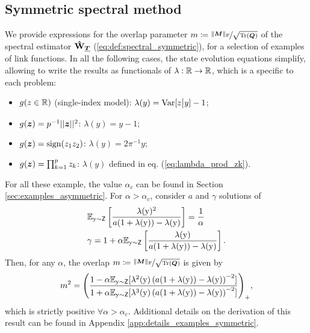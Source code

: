 \subsection{Symmetric spectral method}
We provide expressions for the overlap parameter $m \coloneqq \nicefrac{ \|{\boldsymbol M} \|_{\mathrm{F}} }{\sqrt{{\rm Tr}({\boldsymbol Q})}}$ of the spectral estimator $\boldsymbol{\mathbf{\hat{W}}}_{{\underline{\bm{T}}}}$ (\ref{eq:def:spectral_symmetric}), for a selection of examples of link functions.
In all the following cases, the state evolution equations simplify, allowing to write the results as functionals of $\lambda:\mathbb{R}\to\mathbb{R}$, which is a specific to each problem:
\begin{itemize}
    \item $g(z\in\mathbb{R})$ (single-index model): $\lambda(y) = \text{Var}[z\big|y] - 1$;
    
    \item $g({\boldsymbol z}) = p^{-1}||{\boldsymbol z}||^2$: $\lambda(y) = y - 1$;
    \item $g({\boldsymbol z}) = \operatorname{sign}(z_1z_2)$: $\lambda(y) = 2\pi^{-1}y$;
    \item $g({\boldsymbol z}) = \prod_{k=1}^pz_k$: $\lambda(y)$ defined in eq. (\ref{eq:lambda_prod_zk}).
\end{itemize}
For all these example, the value $\alpha_c$ can be found in Section \ref{sec:examples_asymmetric}.
For $\alpha>\alpha_c$, consider $a$ and $\gamma$ solutions of
\begin{align}\label{eq:examples_symmetric_a}
&\mathbb{E}_{{ \mathrm{y} }\sim\mathsf{Z}}\left[\frac{\lambda({ \mathrm{y} })^2}{a(1 + \lambda({ \mathrm{y} })) - \lambda({ \mathrm{y} }) }\right] = \frac{1}{\alpha}\\
\label{eq:examples_symmetric_gamma}
&\gamma = 1 + \alpha\mathbb{E}_{{ \mathrm{y} }\sim\mathsf{Z}}\left[\frac{\lambda({ \mathrm{y} })}{a(1 + \lambda({ \mathrm{y} })) - \lambda({ \mathrm{y} }) }\right].
\end{align}
Then, for any $\alpha$, the overlap $m \coloneqq \nicefrac{ \|{\boldsymbol M} \|_{\mathrm{F}} }{\sqrt{{\rm Tr}({\boldsymbol Q})}} $ is given by
\begin{equation}\label{eq:examples_symmetric_general}
    m^2 = \Bigg(\frac{1 - \alpha\mathbb{E}_{{ \mathrm{y} }\sim\mathsf{Z}}[\lambda^2({ \mathrm{y} })\left(a(1 + \lambda({ \mathrm{y} })) - \lambda({ \mathrm{y} })\right)^{-2}]}{1 + \alpha\mathbb{E}_{{ \mathrm{y} }\sim\mathsf{Z}}[\lambda^3({ \mathrm{y} })\left(a(1+ \lambda({ \mathrm{y} })) - \lambda({ \mathrm{y} })\right)^{-2}] } \Bigg)_+,
\end{equation}
which is strictly positive $\forall \alpha > \alpha_c$. Additional details on the derivation of this result can be found in Appendix \ref{app:details_examples_symmetric}.
